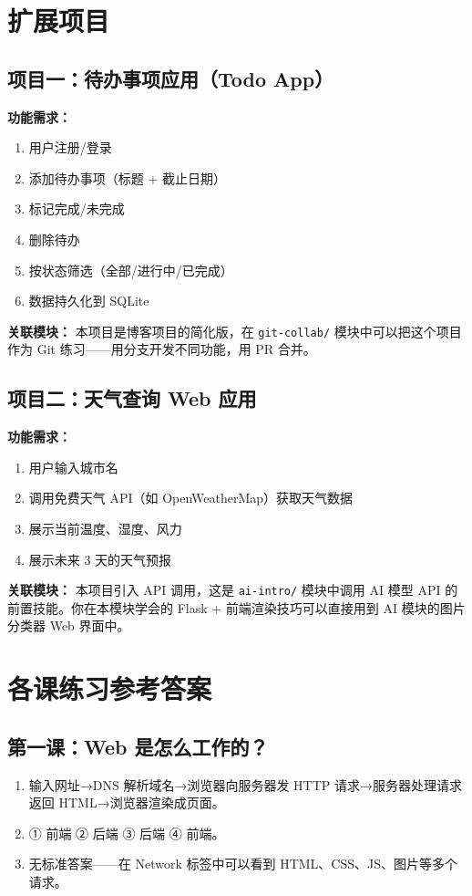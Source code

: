\documentclass[a4paper,12pt]{ctexart}
\begin{document}
\section*{扩展项目}

\subsection*{项目一：待办事项应用（Todo App）}

\textbf{功能需求：}
\begin{enumerate}
  \item 用户注册/登录
  \item 添加待办事项（标题 + 截止日期）
  \item 标记完成/未完成
  \item 删除待办
  \item 按状态筛选（全部/进行中/已完成）
  \item 数据持久化到 SQLite
\end{enumerate}

\textbf{关联模块：} 本项目是博客项目的简化版，在 \texttt{git-collab/} 模块中可以把这个项目作为 Git 练习——用分支开发不同功能，用 PR 合并。

\subsection*{项目二：天气查询 Web 应用}

\textbf{功能需求：}
\begin{enumerate}
  \item 用户输入城市名
  \item 调用免费天气 API（如 OpenWeatherMap）获取天气数据
  \item 展示当前温度、湿度、风力
  \item 展示未来 3 天的天气预报
\end{enumerate}

\textbf{关联模块：} 本项目引入 API 调用，这是 \texttt{ai-intro/} 模块中调用 AI 模型 API 的前置技能。你在本模块学会的 Flask + 前端渲染技巧可以直接用到 AI 模块的图片分类器 Web 界面中。

\section*{\textcolor{blue!70!black}{各课练习参考答案}}

\subsection*{第一课：Web 是怎么工作的？}
\begin{enumerate}
  \item 输入网址→DNS 解析域名→浏览器向服务器发 HTTP 请求→服务器处理请求返回 HTML→浏览器渲染成页面。
  \item ① 前端 ② 后端 ③ 后端 ④ 前端。
  \item 无标准答案——在 Network 标签中可以看到 HTML、CSS、JS、图片等多个请求。
\end{enumerate}
\end{document}
